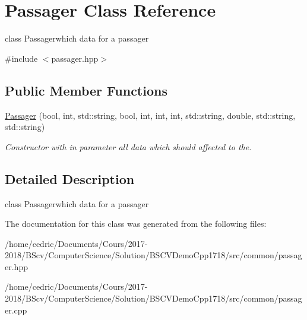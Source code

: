 \hypertarget{class_passager}{}\section{Passager Class Reference}
\label{class_passager}


class Passagerwhich data for a passager  




{\ttfamily \#include $<$passager.\+hpp$>$}

\subsection*{Public Member Functions}
\begin{DoxyCompactItemize}
\item 
\mbox{\label{class_passager_abb998c593a94e49f0ebd614ba8c4bd06}} 
\hyperlink{class_passager_abb998c593a94e49f0ebd614ba8c4bd06}{Passager} (bool, int, std\+::string, bool, int, int, int, std\+::string, double, std\+::string, std\+::string)
\begin{DoxyCompactList}\small\item\em Constructor with in parameter all data which should affected to the. \end{DoxyCompactList}\end{DoxyCompactItemize}


\subsection{Detailed Description}
class Passagerwhich data for a passager 

The documentation for this class was generated from the following files\+:\begin{DoxyCompactItemize}
\item 
/home/cedric/\+Documents/\+Cours/2017-\/2018/\+B\+Scv/\+Computer\+Science/\+Solution/\+B\+S\+C\+V\+Demo\+Cpp1718/src/common/passager.\+hpp\item 
/home/cedric/\+Documents/\+Cours/2017-\/2018/\+B\+Scv/\+Computer\+Science/\+Solution/\+B\+S\+C\+V\+Demo\+Cpp1718/src/common/passager.\+cpp\end{DoxyCompactItemize}
